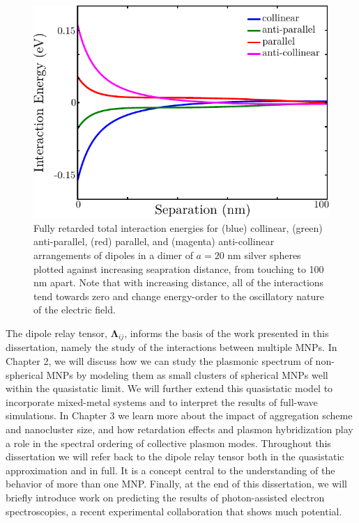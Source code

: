 \documentclass [11pt, proquest] {uwthesis}[2016/11/22]
\begin{document}
\begin{figure}
\begin{centering}
\includegraphics{dimer_ret_total.pdf}
\caption{Fully retarded total interaction energies for (blue) collinear, (green) anti-parallel, (red) parallel, and (magenta) anti-collinear arrangements of dipoles in a dimer of $a=20$ nm silver spheres plotted against increasing seapration distance, from touching to 100 nm apart. Note that with increasing distance, all of the interactions tend towards zero and change energy-order to the oscillatory nature of the electric field.}
\label{dimer_ret_tot}
\end{centering}
\end{figure}

The dipole relay tensor, $\boldsymbol{\Lambda}_{ij}$, informs the basis of the work presented in this dissertation, namely the study of the interactions between multiple MNPs. In Chapter 2, we will discuss how we can study the plasmonic spectrum of non-spherical MNPs by modeling them as small clusters of spherical MNPs well within the quasistatic limit. We will further extend this quasistatic model to incorporate mixed-metal systems and to interpret the results of full-wave simulations. In Chapter 3 we learn more about the impact of aggregation scheme and nanocluster size, and how retardation effects and plasmon hybridization play a role in the spectral ordering of collective plasmon modes. Throughout this dissertation we will refer back to the dipole relay tensor both in the quasistatic approximation and in full. It is a concept central to the understanding of the behavior of more than one MNP. Finally, at the end of this dissertation, we will briefly introduce work on predicting the results of photon-assisted electron spectroscopies, a recent experimental collaboration that shows much potential.
\newpage
\end{document}
